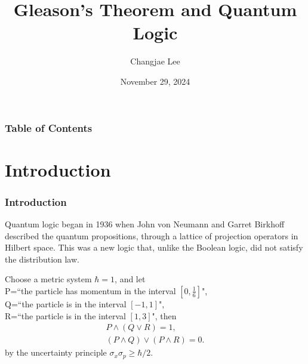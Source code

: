 \documentclass{beamer}
\title{Gleason's Theorem and Quantum Logic}
\author{Changjae Lee\inst{1}}
\institute[SNU]{
    \inst{1}
    Department of Mathematical Science\\
    Seoul National University
}
\date{November 29, 2024}
\begin{document}
\frame{\titlepage}

\begin{frame}
    \frametitle{Table of Contents}
    \tableofcontents
\end{frame}

\section{Introduction}
\begin{frame}
    \frametitle{Introduction}
Quantum logic began in 1936 when John von Neumann and Garret Birkhoff described the quantum propositions, through a lattice of projection operators in Hilbert space. This was a new logic that, unlike the Boolean logic, did not satisfy the distribution law.

\begin{examples}
    Choose a metric system \(\hbar=1\), and let \\
    P=``the particle has momentum in the interval \([0,\frac{1}{6}]\)",\\
    Q=``the particle is in the interval \([-1,1]\)",\\
    R=``the particle is in the interval \([1,3]\)", then
    \begin{gather*}
        P \wedge (Q\vee R) = 1,\\
    (P \wedge Q) \vee (P \wedge R) = 0.
    \end{gather*}
    by the uncertainty principle
    \(\sigma_{x} \sigma_{p} \ge \hbar/2\).
\end{examples}

\end{frame}
\end{document}
